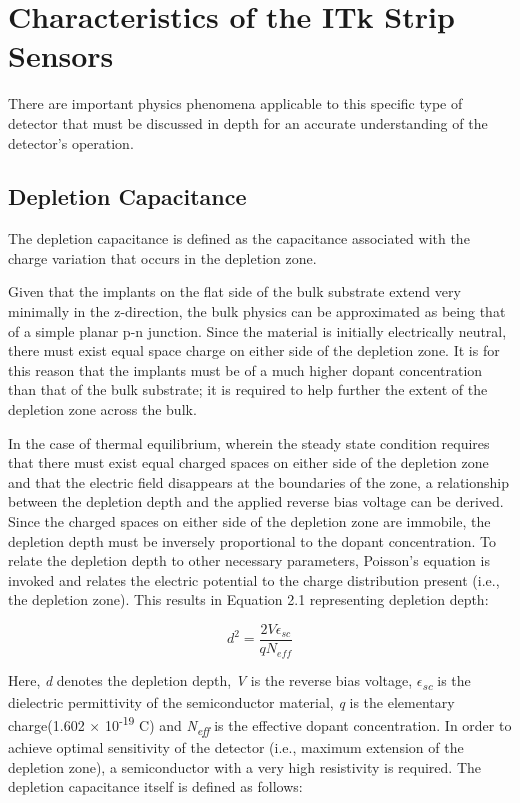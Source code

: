 \documentclass[letterpaper, 11pt]{report}
\begin{document}
\section{Characteristics of the ITk Strip Sensors}

There are important physics phenomena applicable to this specific type of detector that must be discussed in depth for an accurate understanding of the detector's operation.

\subsection{Depletion Capacitance}
The depletion capacitance is defined as the capacitance associated with the charge variation that occurs in the depletion zone. 

Given that the implants on the flat side of the bulk substrate extend very minimally in the z-direction, the bulk physics can be approximated as being that of a simple planar p-n junction.  Since the material is initially electrically neutral, there must exist equal space charge on either side of the depletion zone.  It is for this reason that the implants must be of a much higher dopant concentration than that of the bulk substrate; it is required to help further the extent of the depletion zone across the bulk.

In the case of thermal equilibrium, wherein the steady state condition requires that there must exist equal charged spaces on either side of the depletion zone and that the electric field disappears at the boundaries of the zone, a relationship between the depletion depth and the applied reverse bias voltage can be derived.  Since the charged spaces on either side of the depletion zone are immobile, the depletion depth must be inversely proportional to the dopant concentration.  To relate the depletion depth to other necessary parameters, Poisson's equation is invoked and relates the electric potential to the charge distribution present (i.e., the depletion zone).  This results in Equation 2.1 representing depletion depth:

\begin{equation}
d^2 = \frac{2V\epsilon_{sc}}{qN_{eff}}
\end{equation}

Here, \textit{d} denotes the depletion depth, \textit{V} is the reverse bias voltage, \textit{$\epsilon$\textsubscript{sc}} is the dielectric permittivity of the semiconductor material, \textit{q} is the elementary charge(1.602 $\times$ 10\textsuperscript{-19} C) and \textit{N\textsubscript{eff}} is the effective dopant concentration.  In order to achieve optimal sensitivity of the detector (i.e., maximum extension of the depletion zone), a semiconductor with a very high resistivity is required.  The depletion capacitance itself is defined as follows:
\end{document}
